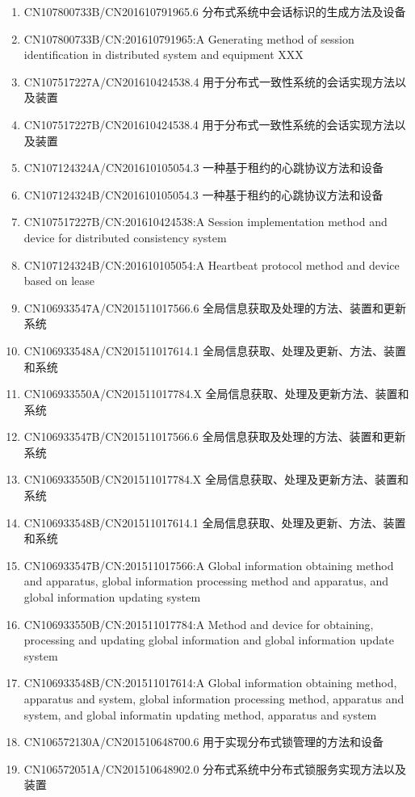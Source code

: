 \documentclass[scheme=plain]{ctexart}
\begin{document}
\begin{enumerate}
    \item CN107800733B/CN201610791965.6 分布式系统中会话标识的生成方法及设备
    \item CN107800733B/CN:201610791965:A Generating method of session identification in distributed system and equipment XXX
    \item CN107517227A/CN201610424538.4 用于分布式一致性系统的会话实现方法以及装置
    \item CN107517227B/CN201610424538.4 用于分布式一致性系统的会话实现方法以及装置
    \item CN107124324A/CN201610105054.3 一种基于租约的心跳协议方法和设备
    \item CN107124324B/CN201610105054.3 一种基于租约的心跳协议方法和设备
    \item CN107517227B/CN:201610424538:A Session implementation method and device for distributed consistency system
    \item CN107124324B/CN:201610105054:A Heartbeat protocol method and device based on lease
    \item CN106933547A/CN201511017566.6 全局信息获取及处理的方法、装置和更新系统
    \item CN106933548A/CN201511017614.1 全局信息获取、处理及更新、方法、装置和系统
    \item CN106933550A/CN201511017784.X 全局信息获取、处理及更新方法、装置和系统
    \item CN106933547B/CN201511017566.6 全局信息获取及处理的方法、装置和更新系统
    \item CN106933550B/CN201511017784.X 全局信息获取、处理及更新方法、装置和系统
    \item CN106933548B/CN201511017614.1 全局信息获取、处理及更新、方法、装置和系统
    \item CN106933547B/CN:201511017566:A Global information obtaining method and apparatus, global information processing method and apparatus, and global information updating system
    \item CN106933550B/CN:201511017784:A Method and device for obtaining, processing and updating global information and global information update system
    \item CN106933548B/CN:201511017614:A Global information obtaining method, apparatus and system, global information processing method, apparatus and system, and global informatin updating method, apparatus and system
    \item CN106572130A/CN201510648700.6 用于实现分布式锁管理的方法和设备
    \item CN106572051A/CN201510648902.0 分布式系统中分布式锁服务实现方法以及装置

\end{enumerate}
\end{document}
